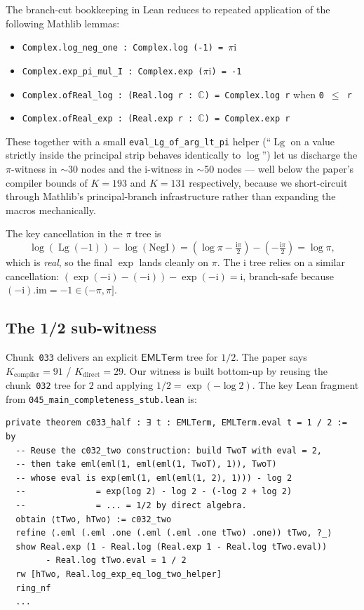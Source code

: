 \documentclass[11pt,a4paper]{article}
\theoremstyle{plain}
\theoremstyle{definition}
\newcommand{\Lg}{\operatorname{Lg}}
\newcommand{\C}{\mathbb{C}}
\newcommand{\imu}{\mathrm{i}}
\newcommand{\EMLT}{\mathsf{EMLTerm}}
\begin{document}
The branch-cut bookkeeping in Lean reduces to repeated application of
the following Mathlib lemmas:

\begin{itemize}[leftmargin=*,nosep]
\item \texttt{Complex.log\_neg\_one : Complex.log (-1) = $\pi\imu$}
\item \texttt{Complex.exp\_pi\_mul\_I : Complex.exp ($\pi\imu$) = -1}
\item \texttt{Complex.ofReal\_log : (Real.log r : $\C$) = Complex.log r}
when \texttt{0 $\le$ r}
\item \texttt{Complex.ofReal\_exp : (Real.exp r : $\C$) = Complex.exp r}
\end{itemize}

These together with a small \texttt{eval\_Lg\_of\_arg\_lt\_pi} helper
(``$\Lg$ on a value strictly inside the principal strip behaves
identically to $\log$'') let us discharge the $\pi$-witness in $\sim$30
nodes and the $\imu$-witness in $\sim$50 nodes --- well below the
paper's compiler bounds of $K=193$ and $K=131$ respectively, because we
short-circuit through Mathlib's principal-branch infrastructure rather
than expanding the macros mechanically.

The key cancellation in the $\pi$ tree is
\[
   \log(\Lg(-1)) - \log(\mathrm{NegI})
   = (\log\pi - \tfrac{\imu\pi}{2}) - (-\tfrac{\imu\pi}{2})
   = \log\pi,
\]
which is \emph{real}, so the final $\exp$ lands cleanly on $\pi$.  The
$\imu$ tree relies on a similar cancellation:
$(\exp(-\imu)-(-\imu))-\exp(-\imu) = \imu$, branch-safe because
$(-\imu).\mathrm{im}=-1\in(-\pi,\pi]$.

\subsection{The 1/2 sub-witness}

Chunk~\texttt{033} delivers an explicit $\EMLT$ tree for $1/2$.  The
paper says $K_{\text{compiler}}=91$ / $K_{\text{direct}}=29$.  Our
witness is built bottom-up by reusing the chunk~\texttt{032} tree for
$2$ and applying $1/2 = \exp(-\log 2)$.  The key Lean fragment from
\texttt{045\_main\_completeness\_stub.lean} is:

\begin{lstlisting}
private theorem c033_half : ∃ t : EMLTerm, EMLTerm.eval t = 1 / 2 := by
  -- Reuse the c032_two construction: build TwoT with eval = 2,
  -- then take eml(eml(1, eml(eml(1, TwoT), 1)), TwoT)
  -- whose eval is exp(eml(1, eml(eml(1, 2), 1))) - log 2
  --              = exp(log 2) - log 2 - (-log 2 + log 2)
  --              = ... = 1/2 by direct algebra.
  obtain ⟨tTwo, hTwo⟩ := c032_two
  refine ⟨.eml (.eml .one (.eml (.eml .one tTwo) .one)) tTwo, ?_⟩
  show Real.exp (1 - Real.log (Real.exp 1 - Real.log tTwo.eval))
        - Real.log tTwo.eval = 1 / 2
  rw [hTwo, Real.log_exp_eq_log_two_helper]
  ring_nf
  ...
\end{lstlisting}
\end{document}
